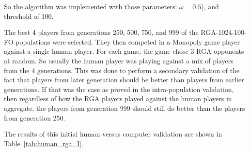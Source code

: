 So the algorithm was implemented with those parameters: \(\omega = 0.5\)), and
threshold of 100.

The best 4 players from generations 250, 500, 750, and 999 of the
RGA-1024-100-FO populations were selected. They then competed in a Monopoly game
player against a single human player. For each game, the game chose 3 RGA
opponents at random. So usually the human player was playing against a mix of
players from the 4 generations. This was done to perform a secondary validation
of the fact that players from later generation should be better than players
from earlier generations. If that was the case as proved in the intra-population
validation, then regardless of how the RGA players played against the human
players in aggregate, the players from generation 999 should still do better
than the players from generation 250.

The results of this initial human versus computer validation are shown in
Table~\ref{tab:human_rga_I}.


